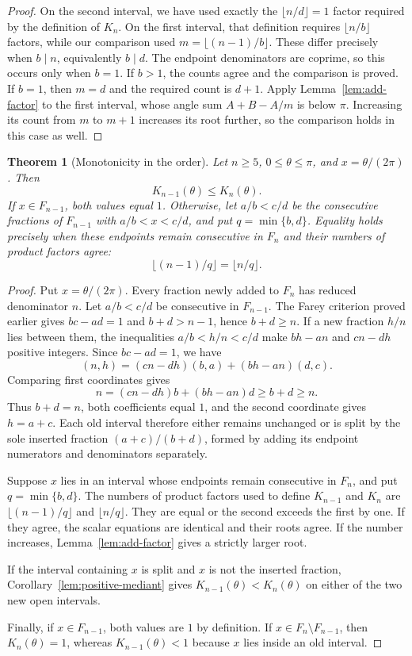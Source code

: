 \documentclass[11pt,a4paper]{article}
\newtheorem{theorem}{Theorem}[section]
\theoremstyle{definition}
\theoremstyle{remark}
\numberwithin{equation}{section}
\begin{document}
\begin{proof}
On the second interval, we have used exactly the $\lfloor n/d\rfloor=1$ factor required by the definition of $K_n$. On the first interval, that definition requires $\lfloor n/b\rfloor$ factors, while our comparison used $m=\lfloor(n-1)/b\rfloor$. These differ precisely when $b\mid n$, equivalently $b\mid d$. The endpoint denominators are coprime, so this occurs only when $b=1$. If $b>1$, the counts agree and the comparison is proved. If $b=1$, then $m=d$ and the required count is $d+1$. Apply Lemma~\ref{lem:add-factor} to the first interval, whose angle sum $A+B-A/m$ is below $\pi$. Increasing its count from $m$ to $m+1$ increases its root further, so the comparison holds in this case as well.
\end{proof}


\begin{theorem}[Monotonicity in the order]\label{thm:order-monotonicity}
Let $n\ge5$, $0\le\theta\le\pi$, and $x=\theta/(2\pi)$. Then
\[
 K_{n-1}(\theta)\le K_n(\theta).
\]
If $x\in F_{n-1}$, both values equal $1$. Otherwise, let $a/b<c/d$ be the consecutive fractions of $F_{n-1}$ with $a/b<x<c/d$, and put $q=\min\{b,d\}$. Equality holds precisely when these endpoints remain consecutive in $F_n$ and their numbers of product factors agree:
\[
 \lfloor(n-1)/q\rfloor=\lfloor n/q\rfloor.
\]
\end{theorem}
\begin{proof}
Put $x=\theta/(2\pi)$. Every fraction newly added to $F_n$ has reduced denominator $n$. Let $a/b<c/d$ be consecutive in $F_{n-1}$. The Farey criterion proved earlier gives $bc-ad=1$ and $b+d>n-1$, hence $b+d\ge n$.
If a new fraction $h/n$ lies between them, the inequalities $a/b<h/n<c/d$ make $bh-an$ and $cn-dh$ positive integers. Since $bc-ad=1$, we have
\[
 (n,h)=(cn-dh)(b,a)+(bh-an)(d,c).
\]
Comparing first coordinates gives
\[
 n=(cn-dh)b+(bh-an)d\ge b+d\ge n.
\]
Thus $b+d=n$, both coefficients equal $1$, and the second coordinate gives $h=a+c$. Each old interval therefore either remains unchanged or is split by the sole inserted fraction $(a+c)/(b+d)$, formed by adding its endpoint numerators and denominators separately.

Suppose $x$ lies in an interval whose endpoints remain consecutive in $F_n$, and put $q=\min\{b,d\}$. The numbers of product factors used to define $K_{n-1}$ and $K_n$ are $\lfloor(n-1)/q\rfloor$ and $\lfloor n/q\rfloor$. They are equal or the second exceeds the first by one. If they agree, the scalar equations are identical and their roots agree. If the number increases, Lemma~\ref{lem:add-factor} gives a strictly larger root.

If the interval containing $x$ is split and $x$ is not the inserted fraction, Corollary~\ref{lem:positive-mediant} gives $K_{n-1}(\theta)<K_n(\theta)$ on either of the two new open intervals.

Finally, if $x\in F_{n-1}$, both values are $1$ by definition. If $x\in F_n\setminus F_{n-1}$, then $K_n(\theta)=1$, whereas $K_{n-1}(\theta)<1$ because $x$ lies inside an old interval.
\end{proof}
\end{document}
